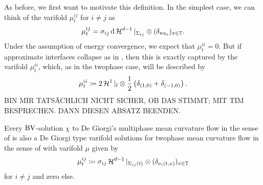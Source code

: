 As before, we first want to motivate this definition. In the simplest case, we 
can think of the varifold $ \mu_{ t }^{ i j } $ for $ i \neq j $ as
\begin{equation}
	\label{varifold_simplest_case_mutliphase}
	\mu_{ t }^{ i j }
	=
	\sigma_{ i j }
	\dd{ \operatorname{\mathcal{H}}^{ d - 1 }|_{ \Sigma_{ i j } } } 
	\otimes
	( \delta_{ nu_{ i } } )_{ x \in \operatorname{\mathbb{T}} }.
\end{equation}
Under the assumption of energy convergence, we expect that $ \mu_{ t }^{ i i } 
= 0 $. But if approximate interfaces collapse as in 
, then this is exactly captured by the 
varifold $ \mu_{ t }^{ i i }$, which, as in the twophase case, will be 
described by
\begin{equation}
	\label{varifold_when_interfaces_collapse}
	\mu_{ t }^{ i i}
	\coloneqq
	2 \operatorname{\mathcal{H}}^{ 1 } |_{ l }
	\otimes
	\frac{ 1 }{ 2 } 
	\left( \delta_{ ( 1 , 0 ) } + \delta_{ ( - 1 , 0 ) } \right).
\end{equation}
BIN MIR TATSÄCHLICH NICHT SICHER, OB DAS STIMMT; MIT TIM BESPRECHEN. DANN 
DIESEN ABSATZ BEENDEN.

\begin{theorem}
	Every $\operatorname{BV}$-solution $ \chi $ to De Giorgi's multiphase mean curvature 
	flow in the sense of  is also a De Giorgi 
	type varifold solutions for twophase mean curvature flow in the sense of
	 with varifold $ \mu $ given by
	\begin{equation*}
		\mu^{ i j }_{ t }
		\coloneqq
		\sigma_{ i j }
		\operatorname{\mathcal{H}}^{ d- 1 }|_{ \Sigma_{ i j } ( t ) }
		\otimes
		( \delta_{ \nu_{ i } ( t, x ) } )_{ x \in \operatorname{\mathbb{T}} }
	\end{equation*} 
	for $ i \neq j $ and zero else.
\end{theorem}

